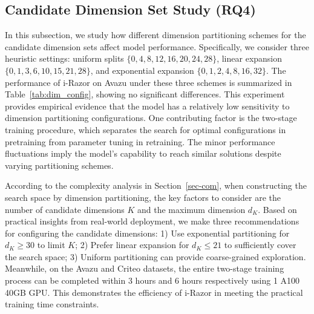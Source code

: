\documentclass[10pt,journal,compsoc]{IEEEtran}
\begin{document}
\subsection{{Candidate Dimension Set Study (RQ4)}}
In this subsection, we study how different dimension partitioning schemes for the candidate dimension sets affect model performance. Specifically, we consider three heuristic settings: uniform splits $\{0, 4, 8, 12, 16, 20, 24, 28\}$, linear expansion $\{0, 1, 3, 6, 10, 15, 21, 28\}$, and exponential expansion $\{0, 1, 2, 4, 8, 16, 32\}$. 
The performance of i-Razor on Avazu under these three schemes is summarized in Table~\ref{tab:dim_config}, showing no significant differences.
This experiment provides empirical evidence that the model has a relatively low sensitivity to dimension partitioning configurations. One contributing factor is the two-stage training procedure, which separates the search for optimal configurations in pretraining from parameter tuning in retraining. The minor performance fluctuations imply the model's capability to reach similar solutions despite varying partitioning schemes.

According to the complexity analysis in Section~\ref{sec-com}, when constructing the search space by dimension partitioning, the key factors to consider are the number of candidate dimensions $K$ and the maximum dimension $d_K$.
Based on practical insights from real-world deployment, we make three recommendations for configuring the candidate dimensions: 1) Use exponential partitioning for $d_K\geq30$ to limit $K$; 2) Prefer linear expansion for $d_K\leq21$ to sufficiently cover the search space; 3) Uniform partitioning can provide coarse-grained exploration.
Meanwhile, on the Avazu and Criteo datasets, the entire two-stage training process can be completed within 3 hours and 6 hours respectively using 1 A100 40GB GPU.
This demonstrates the efficiency of i-Razor in meeting the practical training time constraints.

\begin{table}[t]
\caption{
{Impact of Candidate Dimension Set on Model Performance on Avazu.}
}
\label{tab:dim_config}
\end{table}
\end{document}
